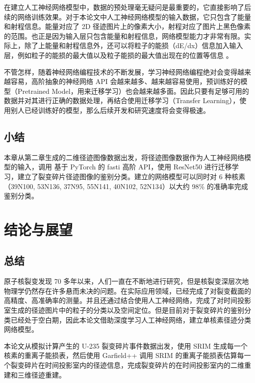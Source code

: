 \documentclass[AutoFakeBold]{LZUThesis}
\begin{document}
在建立人工神经网络模型中，数据的预处理毫无疑问是最重要的，它直接影响了后续的网络训练效果。对于本论文中人工神经网络模型的输入数据，它只包含了能量和射程信息。能量对应了 2D 径迹图片上的像素大小，射程对应了图片上黑色像素的范围。也正是因为输入层只包含能量和射程信息，网络模型能力才非常有限。实际上，除了上能量和射程信息外，还可以将粒子的能损（dE/dx）信息加入输入层，例如粒子的能损的最大值以及粒子能损的最大值出现在的位置等信息 \cite{闫洋洋2018用于高精度裂变截面测量的时间投影室}。

不管怎样，随着神经网络编程技术的不断发展，学习神经网络编程绝对会变得越来越容易，高阶抽象的神经网络 API 会越来越多、越来越容易使用，预训练好的模型（Pretrained Model，用来迁移学习）也会越来越多面。因此只要有足够可用的数据并对其进行正确的数据处理，再结合使用迁移学习（Transfer Learning），使用别人已经训练好的模型，那么后续开发和研究速度将会变得极速。



\section{小结}
本章从第二章生成的二维径迹图像数据出发，将径迹图像数据作为人工神经网络模型的输入，调用 基于 PyTorch 的 fasti 高阶 API，使用 ResNet50 进行迁移学习，建立了裂变碎片径迹图像的鉴别分类。建立的网络模型可以同时对 6 种核素（39N100, 53N136, 37N95, 55N141, 40N102, 52N134）以大约 98\% 的准确率完成鉴别分类。








\chapter{结论与展望}
\section{总结}
原子核裂变发现 70 多年以来，人们一直在不断地进行研究，但是核裂变深层次地物理学仍然存在许多悬而未决的问题。在实际应用领域，已经完成了对裂变截面的高精度、高准确率的测量。并且还通过结合使用人工神经网络，完成了对时间投影室生成的径迹图片中的粒子的分类以及空间定位。但是目前对于裂变碎片的鉴别分类已经处于空白期，因此本论文借助深度学习人工神经网络，建立单核素径迹分类网络模型。

本论文从模拟计算产生的 U-235 裂变碎片事件数据出发，使用 SRIM 生成每一个核素的重离子能损表，然后使用 Garfield++ 调用 SRIM 的重离子能损表估算每一个裂变碎片在时间投影室内的径迹信息，完成裂变碎片的在时间投影室内的二维重建和三维径迹重建。
\end{document}
